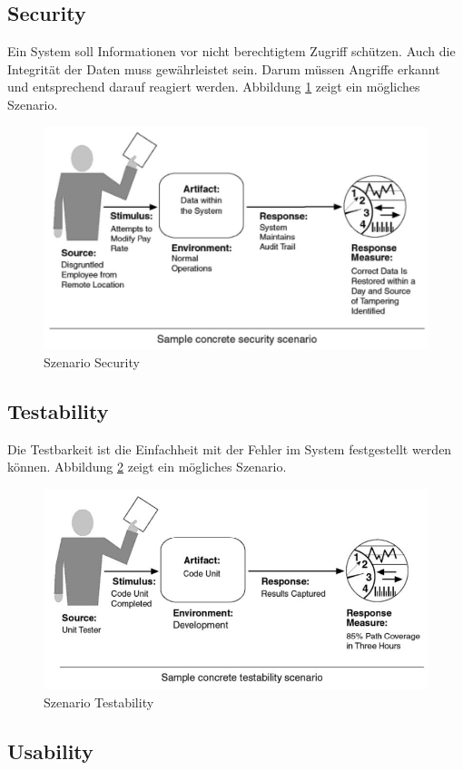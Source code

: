 \subsection{Security}

Ein System soll Informationen vor nicht berechtigtem Zugriff schützen. Auch die Integrität der Daten muss gewährleistet sein. Darum müssen Angriffe erkannt und entsprechend darauf reagiert werden. Abbildung \ref{fig:security} zeigt ein mögliches Szenario.

\begin{figure}[h!]
\centering
\includegraphics[width=0.7\linewidth]{fig/security}
\caption{Szenario Security}
\label{fig:security}
\end{figure}

\subsection{Testability}

Die Testbarkeit ist die Einfachheit mit der Fehler im System festgestellt werden können. Abbildung \ref{fig:testability} zeigt ein mögliches Szenario.

\begin{figure}[h!]
\centering
\includegraphics[width=0.7\linewidth]{fig/testability}
\caption{Szenario Testability}
\label{fig:testability}
\end{figure}

\subsection{Usability}

